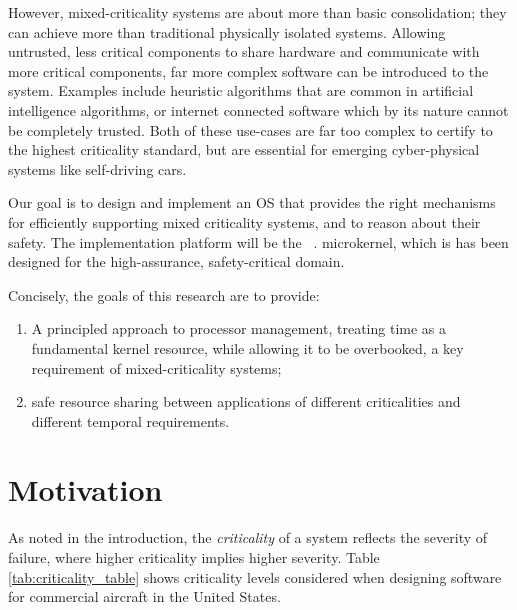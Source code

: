 However, mixed-criticality systems are about more than basic consolidation; they can achieve more
than traditional physically isolated systems. Allowing untrusted, less critical components to
share hardware and communicate with more critical components, far more complex software can be
introduced to the system. Examples include heuristic algorithms that are common in artificial
intelligence algorithms, or internet connected software which by its nature cannot be completely
trusted. Both of these use-cases are far too complex to certify to the highest criticality standard,
but are essential for emerging cyber-physical systems like self-driving cars.

Our goal is to design and implement an OS that provides the right mechanisms for efficiently
supporting mixed criticality systems, and to reason about their safety.
The implementation platform will be the \selfour~\citep{Klein_EHACDEEKNSTW_09}.
microkernel, which is has been designed for the high-assurance, safety-critical domain.

Concisely, the goals of this research are to provide:
\begin{enumerate}[label=\textbf{G\arabic*}] 
    \item\label{G1} A principled approach to
    processor management, treating time as a fundamental kernel resource, while
    allowing it to be overbooked, a key requirement of mixed-criticality systems;
    \item safe resource sharing between applications of different criticalities and
    different temporal requirements.  
\end{enumerate}


\section{Motivation}

As noted in the introduction, the \emph{criticality} of a system reflects the
severity of failure, where higher criticality implies higher severity.  Table
\ref{tab:criticality_table} shows criticality levels considered when designing
software for commercial aircraft in the United States.


